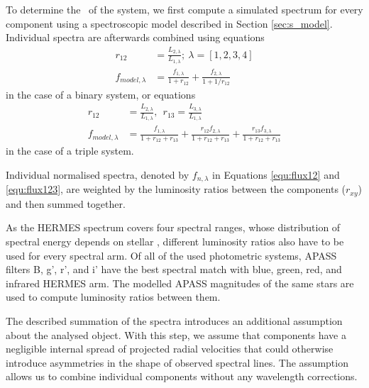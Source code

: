 To determine the \Feh\ of the system, we first compute a simulated spectrum for every component using a spectroscopic model described in Section \ref{sec:s_model}. Individual spectra are afterwards combined using equations
\begin{equation}
	\label{equ:flux12}
	\begin{aligned}  %
	r_{12} &= \frac{L_{2,\lambda}}{L_{1,\lambda}}; \ \lambda=[1, 2, 3, 4]\\ 
	f_{model,\lambda} &= \frac{f_{1,\lambda}}{1+r_{12}} + \frac{f_{2,\lambda}}{1+1/r_{12}}
	\end{aligned}
\end{equation}
in the case of a binary system, or equations
\begin{equation}
	\label{equ:flux123}
	\begin{aligned}
	r_{12} &= \frac{L_{2,\lambda}}{L_{1,\lambda}},\ \ r_{13} = \frac{L_{3,\lambda}}{L_{1,\lambda}}\\ 
	f_{model,\lambda} &= \frac{f_{1,\lambda}}{1 + r_{12} + r_{13}} + \frac{r_{12} f_{2,\lambda}}{1 + r_{12} + r_{13}} + \frac{r_{13} f_{3,\lambda}}{1 + r_{12} + r_{13}}
	\end{aligned}
\end{equation}
in the case of a triple system. 

Individual normalised spectra, denoted by $f_{n,\lambda}$ in Equations \ref{equ:flux12} and \ref{equ:flux123}, are weighted by the luminosity ratios between the components ($r_{xy}$) and then summed together. 

As the HERMES spectrum covers four spectral ranges, whose distribution of spectral energy depends on stellar \Teff, different luminosity ratios also have to be used for every spectral arm. Of all of the used photometric systems, APASS filters B, g', r', and i' have the best spectral match with blue, green, red, and infrared HERMES arm. The modelled APASS magnitudes of the same stars are used to compute luminosity ratios between them.

The described summation of the spectra introduces an additional assumption about the analysed object. With this step, we assume that components have a negligible internal spread of projected radial velocities that could otherwise introduce asymmetries in the shape of observed spectral lines. The assumption allows us to combine individual components without any wavelength corrections.


